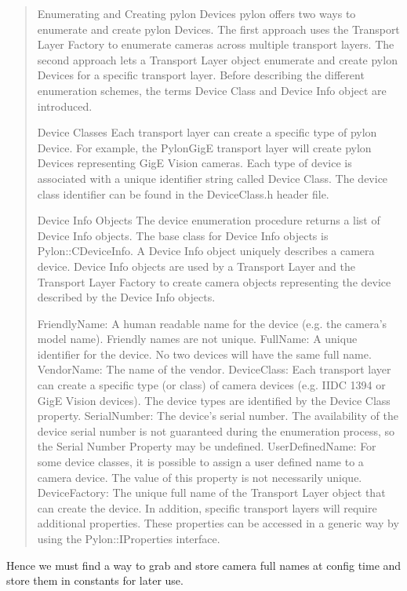 \begin{quotation}
Enumerating and Creating pylon Devices
pylon offers two ways to enumerate and create pylon Devices. The first approach uses the Transport Layer Factory to enumerate cameras across multiple transport layers. The second approach lets a Transport Layer object enumerate and create pylon Devices for a specific transport layer. Before describing the different enumeration schemes, the terms Device Class and Device Info object are introduced.

Device Classes
Each transport layer can create a specific type of pylon Device. For example, the PylonGigE transport layer will create pylon Devices representing GigE Vision cameras. Each type of device is associated with a unique identifier string called Device Class. The device class identifier can be found in the DeviceClass.h header file.

Device Info Objects
The device enumeration procedure returns a list of Device Info objects. The base class for Device Info objects is Pylon::CDeviceInfo. A Device Info object uniquely describes a camera device. Device Info objects are used by a Transport Layer and the Transport Layer Factory to create camera objects representing the device described by the Device Info objects.

FriendlyName:	A human readable name for the device (e.g. the camera's model name). Friendly names are not unique.
FullName:	A unique identifier for the device. No two devices will have the same full name.
VendorName:	The name of the vendor.
DeviceClass:	Each transport layer can create a specific type (or class) of camera devices (e.g. IIDC 1394 or GigE Vision devices). The device types are identified by the Device Class property.
SerialNumber:	The device's serial number. The availability of the device serial number is not guaranteed during the enumeration process, so the Serial Number Property may be undefined.
UserDefinedName:	For some device classes, it is possible to assign a user defined name to a camera device. The value of this property is not necessarily unique.
DeviceFactory:	The unique full name of the Transport Layer object that can create the device.
In addition, specific transport layers will require additional properties. These properties can be accessed in a generic way by using the Pylon::IProperties interface.
\end{quotation}

Hence we must find a way to grab and store camera full names at config time and store them in constants for later use.

